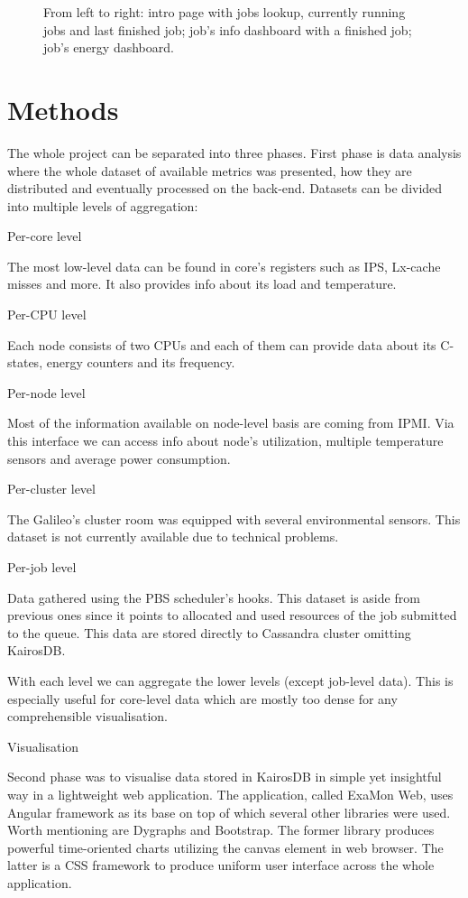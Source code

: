 \documentclass[a4paper, twoside]{article}
\newcommand{\highlight}[1]{\textcolor{prace-orange}{#1}}
\newcommand{\itempar}[1]{\noindent\highlight{\textsf #1}\par\noindent}
\begin{document}
\begin{multicols}{3}
\begin{figure}[b!]
    \caption{From left to right: intro page with jobs lookup, currently running jobs and last finished job; job's info dashboard with a finished job; job's energy dashboard.}
    \label{fig:job}
\end{figure}

\section*{Methods}
The whole project can be separated into three phases. First phase is data analysis where the whole dataset of available metrics was presented, how they are distributed and eventually processed on the back-end. Datasets can be divided into multiple levels of aggregation:

\itempar{Per-core level}
The most low-level data can be found in core's registers such as IPS, Lx-cache misses and more. It also provides info about its load and temperature.

\itempar{Per-CPU level}
Each node consists of two CPUs and each of them can provide data about its C-states, energy counters and its frequency.

\itempar{Per-node level}
Most of the information available on node-level basis are coming from IPMI\cite{ipmi}. Via this interface we can access info about node's utilization, multiple temperature sensors and average power consumption.

\itempar{Per-cluster level}
The Galileo's cluster room was equipped with several environmental sensors. This dataset is not currently available due to technical problems.

\itempar{Per-job level}
Data gathered using the PBS scheduler's hooks. This dataset is aside from previous ones since it points to allocated and used resources of the job submitted to the queue. This data are stored directly to Cassandra cluster omitting KairosDB.

With each level we can aggregate the lower levels (except job-level data). This is especially useful for core-level data which are mostly too dense for any comprehensible visualisation.

\itempar{Visualisation}
Second phase was to visualise data stored in KairosDB in simple yet insightful way in a lightweight web application. The application, called ExaMon Web, uses Angular framework as its base on top of which several other libraries were used. Worth mentioning are Dygraphs and Bootstrap. The former library produces powerful time-oriented charts utilizing the canvas element in web browser. The latter is a CSS framework to produce uniform user interface across the whole application.


\end{multicols}
\end{document}
